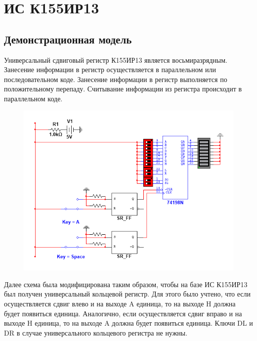 \section*{ИС К155ИР13}
\subsection*{Демонстрационная модель}

Универсальный сдвиговый регистр К155ИР13 является восьмиразрядным. Занесение
информации в регистр осуществляется в параллельном или последовательном коде.
Занесение информации в регистр выполняется по положительному перепаду. 
Считывание информации из регистра происходит в параллельном коде.

\begin{figure}[h!]
    \centering
    \includegraphics[scale=0.9]{images/image-2.png}
\end{figure}

\newpage

Далее схема была модифицирована таким образом, чтобы на базе ИС К155ИР13 был
получен универсальный кольцевой регистр. Для этого было учтено, что если
осуществляется сдвиг влево и на выходе A единица, то на выходе H должна будет появиться
единица. Аналогично, если осуществляется сдвиг вправо и на выходе H единица, то на
выходе A должна будет появиться единица. Ключи DL и DR в случае универсального
кольцевого регистра не нужны.

